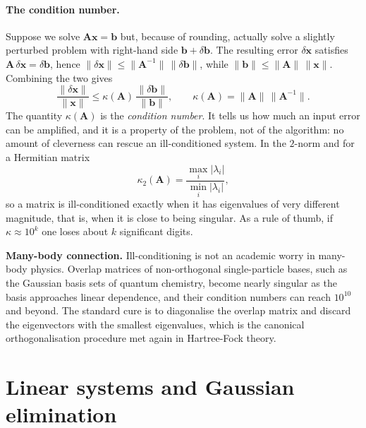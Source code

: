 \paragraph{The condition number.}
Suppose we solve $\bm{A}\bm{x}=\bm{b}$ but, because of rounding, actually
solve a slightly perturbed problem with right-hand side $\bm{b}+\delta\bm{b}$.
The resulting error $\delta\bm{x}$ satisfies
$\bm{A}\,\delta\bm{x}=\delta\bm{b}$, hence
$\|\delta\bm{x}\|\le\|\bm{A}^{-1}\|\,\|\delta\bm{b}\|$, while
$\|\bm{b}\|\le\|\bm{A}\|\,\|\bm{x}\|$.  Combining the two gives
\begin{equation}
  \frac{\|\delta\bm{x}\|}{\|\bm{x}\|} \le
  \kappa(\bm{A})\,\frac{\|\delta\bm{b}\|}{\|\bm{b}\|},
  \qquad
  \kappa(\bm{A}) = \|\bm{A}\|\,\|\bm{A}^{-1}\| .
  \label{eq:1-condition}
\end{equation}
The quantity $\kappa(\bm{A})$ is the \emph{condition number}.  It tells us how
much an input error can be amplified, and it is a property of the problem, not
of the algorithm: no amount of cleverness can rescue an ill-conditioned
system.  In the $2$-norm and for a Hermitian matrix
\begin{equation}
  \kappa_2(\bm{A}) =
    \frac{\max_i |\lambda_i|}{\min_i |\lambda_i|},
  \label{eq:1-cond2}
\end{equation}
so a matrix is ill-conditioned exactly when it has eigenvalues of very
different magnitude, that is, when it is close to being singular.  As a rule
of thumb, if $\kappa\approx 10^{k}$ one loses about $k$ significant digits.

\begin{notebox}
\textbf{Many-body connection.} Ill-conditioning is not an academic worry in
many-body physics.  Overlap matrices of non-orthogonal single-particle bases,
such as the Gaussian basis sets of quantum chemistry, become nearly singular
as the basis approaches linear dependence, and their condition numbers can
reach $10^{10}$ and beyond.  The standard cure is to diagonalise the overlap
matrix and discard the eigenvectors with the smallest eigenvalues, which is
the canonical orthogonalisation procedure met again in Hartree-Fock theory.
\end{notebox}

\section{Linear systems and Gaussian elimination}
\label{sec:gauss}

